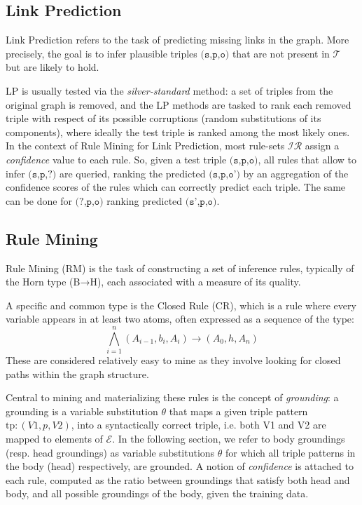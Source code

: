 \documentclass[a4paper,UKenglish,cleveref, autoref, thm-restate]{tgdk-v2021}
\begin{document}
\subsection{Link Prediction}
Link Prediction  refers to the task of predicting missing links in the graph. More precisely, the goal is to infer plausible triples $\texttt{(s,p,o)}$ that are not present in $\mathcal{T}$ but are likely to hold.

LP is usually tested via the \textit{silver-standard} method: a set of triples from the original graph is removed, and the LP methods are tasked to rank each removed triple with respect of its possible corruptions (random substitutions of its components), where ideally the test triple is ranked among the most likely ones. 
In the context of Rule Mining for Link Prediction, most rule-sets $\mathcal{IR}$ assign a \textit{confidence} value to each rule. So, given a test triple $\texttt{(s,p,o)}$, all rules that allow to infer $\texttt{(s,p,?)}$ are queried, ranking the predicted $\texttt{(s,p,o')}$ by an aggregation of the confidence scores of the rules which can correctly predict each triple. The same can be done for $\texttt{(?,p,o)}$ ranking predicted $\texttt{(s',p,o)}$.

\subsection{Rule Mining}

Rule Mining (RM) is the task of constructing a set of inference rules, typically of the Horn type (B→H), each associated with a measure of its quality.

A specific and common type is the Closed Rule (CR), which is a rule where every variable appears in at least two atoms, often expressed as a sequence of the type: $$\bigwedge_{i=1}^{n} (A_{i-1}, b_i, A_i) \rightarrow (A_0, h , A_n)$$ 
These are considered relatively easy to mine as they involve looking for closed paths within the graph structure.

Central to mining and materializing these rules is the concept of \textit{grounding}: a grounding  is a variable substitution $\theta$ that maps a given triple pattern $\text{tp}: (V1, p, V2)$, into a syntactically correct triple, i.e. both V1 and V2 are mapped to elements of $\mathcal{E}$.
In the following section, we refer to body groundings (resp. head groundings) as variable substitutions $\theta$ for which all triple patterns in the body (head) respectively, are grounded. A notion of \textit{confidence} is attached to each rule, computed as the ratio between groundings that satisfy both head and body, and all possible groundings of the body, given the training data.
    
\end{document}
